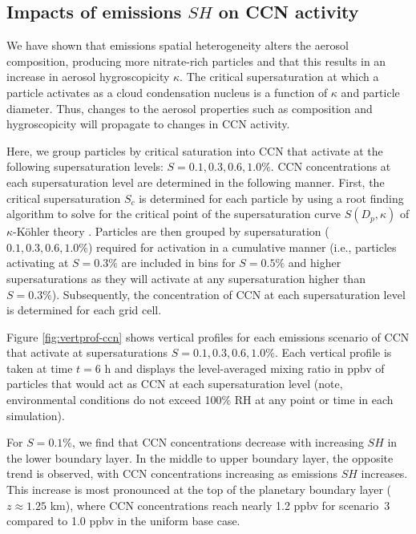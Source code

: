 \subsection{Impacts of emissions $SH$ on CCN activity}

We have shown that emissions spatial heterogeneity alters the aerosol composition, producing more nitrate-rich particles and that this results in an increase in aerosol hygroscopicity $\kappa$. The critical supersaturation at which a particle activates as a cloud condensation nucleus is a function of $\kappa$ and particle diameter. Thus, changes to the aerosol properties such as composition and hygroscopicity will propagate to changes in CCN activity. 

Here, we group particles by critical saturation into CCN that activate at the following supersaturation levels:  $S=0.1, 0.3, 0.6, 1.0\%$. CCN concentrations at each supersaturation level are determined in the following manner. First, the critical supersaturation $S_c$ is determined for each particle by using a root finding algorithm to solve for the critical point of the supersaturation curve $S(D_p, \kappa)$ of $\kappa$-Köhler theory \parencite{petters_single_2007}. Particles are then grouped by supersaturation ($0.1, 0.3, 0.6, 1.0\%$) required for activation in a cumulative manner (i.e., particles activating at $S=0.3\%$ are included in bins for $S=0.5\%$ and higher supersaturations as they will activate at any supersaturation higher than $S=0.3\%$). Subsequently, the concentration of CCN at each supersaturation level is determined for each grid cell. 

Figure \ref{fig:vertprof-ccn} shows vertical profiles for each emissions scenario of CCN that activate at supersaturations $S=0.1, 0.3, 0.6, 1.0\%$. Each vertical profile is taken at time $t=6$ h and displays the level-averaged mixing ratio in ppbv of particles that would act as CCN at each supersaturation level (note, environmental conditions do not exceed 100\% RH at any point or time in each simulation).  

For $S=0.1\%$, we find that CCN concentrations decrease with increasing $SH$ in the lower boundary layer. In the middle to upper boundary layer, the opposite trend is observed, with CCN concentrations increasing as emissions $SH$ increases. This increase is most pronounced at the top of the planetary boundary layer ($z\approx 1.25$ km), where CCN concentrations reach nearly 1.2 ppbv for scenario~3 compared to 1.0 ppbv in the uniform base case. 

